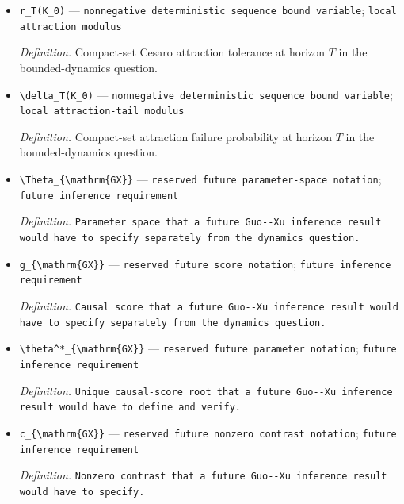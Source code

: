 \documentclass{article}
\begin{document}
\begin{itemize}
  \item \texttt{r\_\allowbreak{}T(K\_\allowbreak{}0)} --- \texttt{nonnegative deterministic sequence bound variable}; \texttt{local attraction modulus}
  \par\smallskip\noindent\emph{Definition.} Compact-set Cesaro attraction tolerance at horizon \(T\) in the bounded-dynamics question.
  \item \texttt{\textbackslash{}\allowbreak{}delta\_\allowbreak{}T(K\_\allowbreak{}0)} --- \texttt{nonnegative deterministic sequence bound variable}; \texttt{local attraction-\allowbreak{}tail modulus}
  \par\smallskip\noindent\emph{Definition.} Compact-set attraction failure probability at horizon \(T\) in the bounded-dynamics question.
  \item \texttt{\textbackslash{}\allowbreak{}Theta\_\allowbreak{}\{\textbackslash{}\allowbreak{}mathrm\{GX\}\allowbreak{}\}\allowbreak{}} --- \texttt{reserved future parameter-\allowbreak{}space notation}; \texttt{future inference requirement}
  \par\smallskip\noindent\emph{Definition.} \texttt{Parameter space that a future Guo-\allowbreak{}-\allowbreak{}Xu inference result would have to specify separately from the dynamics question.}
  \item \texttt{g\_\allowbreak{}\{\textbackslash{}\allowbreak{}mathrm\{GX\}\allowbreak{}\}\allowbreak{}} --- \texttt{reserved future score notation}; \texttt{future inference requirement}
  \par\smallskip\noindent\emph{Definition.} \texttt{Causal score that a future Guo-\allowbreak{}-\allowbreak{}Xu inference result would have to specify separately from the dynamics question.}
  \item \texttt{\textbackslash{}\allowbreak{}theta\textasciicircum{}*\_\allowbreak{}\{\textbackslash{}\allowbreak{}mathrm\{GX\}\allowbreak{}\}\allowbreak{}} --- \texttt{reserved future parameter notation}; \texttt{future inference requirement}
  \par\smallskip\noindent\emph{Definition.} \texttt{Unique causal-\allowbreak{}score root that a future Guo-\allowbreak{}-\allowbreak{}Xu inference result would have to define and verify.}
  \item \texttt{c\_\allowbreak{}\{\textbackslash{}\allowbreak{}mathrm\{GX\}\allowbreak{}\}\allowbreak{}} --- \texttt{reserved future nonzero contrast notation}; \texttt{future inference requirement}
  \par\smallskip\noindent\emph{Definition.} \texttt{Nonzero contrast that a future Guo-\allowbreak{}-\allowbreak{}Xu inference result would have to specify.}

\end{itemize}
\end{document}

